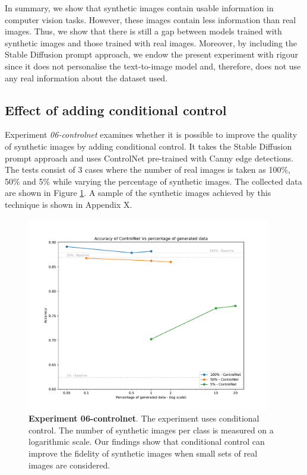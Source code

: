 In summary, we show that synthetic images contain usable information in computer vision tasks. However, these images contain less information than real images. Thus, we show that there is still a gap between models trained with synthetic images and those trained with real images. Moreover, by including the Stable Diffusion prompt approach, we endow the present experiment with rigour since it does not personalise the text-to-image model and, therefore, does not use any real information about the dataset used.

\subsection{Effect of adding conditional control} \label{sec: exp-06}

Experiment \textit{06-controlnet} examines whether it is possible to improve the quality of synthetic images by adding conditional control. It takes the Stable Diffusion prompt approach and uses ControlNet pre-trained with Canny edge detections. The tests consist of 3 cases where the number of real images is taken as 100\%, 50\% and 5\% while varying the percentage of synthetic images. The collected data are shown in Figure \ref{fig:exp6}. A sample of the synthetic images achieved by this technique is shown in Appendix X.

\begin{figure}[ht]
    \centering
    \includegraphics[width=0.95\textwidth]{Pictures/experiment_006.pdf}
    \caption{\textbf{Experiment 06-controlnet}. The experiment uses conditional control. The number of synthetic images per class is measured on a logarithmic scale. Our findings show that conditional control can improve the fidelity of synthetic images when small sets of real images are considered.}
    \label{fig:exp6}
\end{figure}

